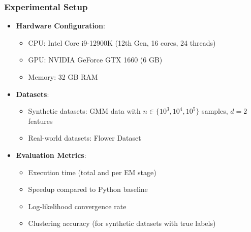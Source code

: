 \documentclass{beamer}
\begin{document}
\begin{frame}
    \frametitle{Experimental Setup}
    \begin{itemize}
        \item \textbf{Hardware Configuration}:
        \begin{itemize}
            \item CPU: Intel Core i9-12900K (12th Gen, 16 cores, 24 threads)
            \item GPU: NVIDIA GeForce GTX 1660 (6 GB)
            \item Memory: 32 GB RAM
        \end{itemize}
        \item \textbf{Datasets}:
        \begin{itemize}
            \item Synthetic datasets: GMM data with $n \in \{10^3, 10^4, 10^5\}$ samples, $d = 2$ features
            \item Real-world datasets: Flower Dataset
        \end{itemize}
        \item \textbf{Evaluation Metrics}:
        \begin{itemize}
            \item Execution time (total and per EM stage)
            \item Speedup compared to Python baseline
            \item Log-likelihood convergence rate
            \item Clustering accuracy (for synthetic datasets with true labels)
        \end{itemize}
    \end{itemize}
\end{frame}
\end{document}
